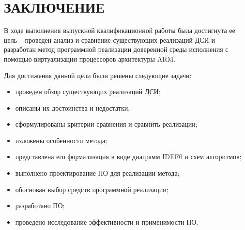 \section*{ЗАКЛЮЧЕНИЕ}

В ходе выполнения выпускной квалификационной работы была достигнута ее цель -- проведен анализ и сравнение существующих реализаций ДСИ и разработан метод программной реализации доверенной среды исполнения с помощью виртуализации процессоров архитектуры ARM.

Для достижения данной цели были решены следующие задачи:

\begin{itemize}
	\item проведен обзор существующих реализаций ДСИ;
	\item описаны их достоинства и недостатки;
	\item сформулированы критерии сравнения и сравнить реализации;
	\item изложены особенности метода;
	\item представлена его формализация в виде диаграмм IDEF0 и схем алгоритмов;
	\item выполнено проектирование ПО для реализации метода;
	\item обоснован выбор средств программной реализации;
	\item разработано ПО;
	\item проведено исследование эффективности и применимости ПО.
\end{itemize}

\pagebreak